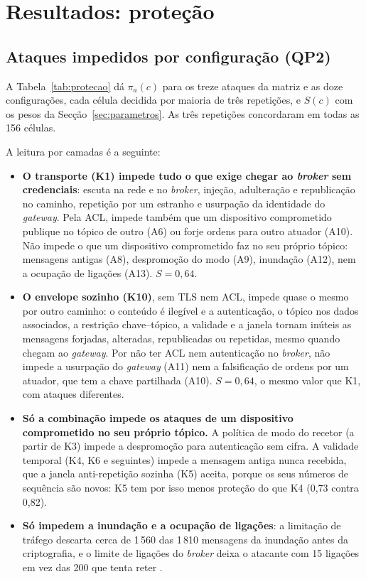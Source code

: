 \section{Resultados: proteção}
\label{sec:protecao}

\subsection{Ataques impedidos por configuração (QP2)}

A Tabela~\ref{tab:protecao} dá $\pi_a(c)$ para os treze ataques da matriz e as
doze configurações, cada célula decidida por maioria de três repetições, e
$S(c)$ com os pesos da Secção~\ref{sec:parametros}. As três repetições
concordaram em todas as 156 células.


A leitura por camadas é a seguinte:

\begin{itemize}[leftmargin=*]
  \item \textbf{O transporte (K1) impede tudo o que exige chegar ao \emph{broker}
    sem credenciais}: escuta na rede e no \emph{broker}, injeção, adulteração e
    republicação no caminho, repetição por um estranho e usurpação da identidade
    do \emph{gateway}. Pela ACL, impede também que um dispositivo comprometido
    publique no tópico de outro (A6) ou forje ordens para outro atuador (A10).
    Não impede o que um dispositivo comprometido faz no seu próprio tópico:
    mensagens antigas (A8), despromoção do modo (A9), inundação (A12), nem a
    ocupação de ligações (A13). $S = 0{,}64$.
  \item \textbf{O envelope sozinho (K10)}, sem TLS nem ACL, impede quase o mesmo
    por outro caminho: o conteúdo é ilegível e a autenticação, o tópico nos dados
    associados, a restrição chave--tópico, a validade e a janela tornam inúteis as
    mensagens forjadas, alteradas, republicadas ou repetidas, mesmo quando
    chegam ao \emph{gateway}. Por não ter ACL nem autenticação no \emph{broker},
    não impede a usurpação do \emph{gateway} (A11) nem a falsificação de ordens
    por um atuador, que tem a chave partilhada (A10). $S = 0{,}64$, o mesmo valor
    que K1, com ataques diferentes.
  \item \textbf{Só a combinação impede os ataques de um dispositivo comprometido no
    seu próprio tópico.} A política de modo do recetor (a partir de K3) impede a
    despromoção para autenticação sem cifra. A validade temporal (K4, K6 e
    seguintes) impede a mensagem antiga nunca recebida, que a janela
    anti-repetição sozinha (K5) aceita, porque os seus números de sequência são
    novos: K5 tem por isso menos proteção do que K4 (0,73 contra 0,82).
  \item \textbf{Só  impedem a inundação e a ocupação de ligações}:
    a limitação de tráfego descarta cerca de 1\,560 das 1\,810 mensagens da
    inundação antes da criptografia, e o limite de ligações do \emph{broker} deixa
    o atacante com 15 ligações em vez das 200 que tenta reter .
\end{itemize}

